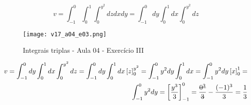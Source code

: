\begin{enumerate}
	\begin{equation*}
		v = \int_{-1}^0 \int_0^1 \int_0^{y^2} dzdxdy = \int_{-1}^0 dy \int_0^1 dx \int_0^{y^2} dz	
	\end{equation*}
	
	\begin{figure}[htb]
		\caption{Integrais triplas - Aula 04 - Exercício III}
		\label{v17_a04_e03}
		\centering
		\texttt{[image: v17\_a04\_e03.png]}		
	\end{figure}
	
	\begin{align*}
		v = \int_{-1}^0 dy \int_0^1 dx \int_0^{y^2} dz = \int_{-1}^0 dy \int_0^1 dx \left[z\right]_0^{y^2} = \int_{-1}^0 y^2 dy \int_0^1 dx = \int_{-1}^0 y^2 dy \left[x\right]_0^1 =\\ \int_{-1}^0 y^2 dy = \left[\dfrac{y^3}{3}\right]_{-1}^0 = \dfrac{\overstrike{0^3}}{\overstrike{3}} - \dfrac{(-1)^3}{3} = \dfrac{1}{3}
	\end{align*}
\end{enumerate}
